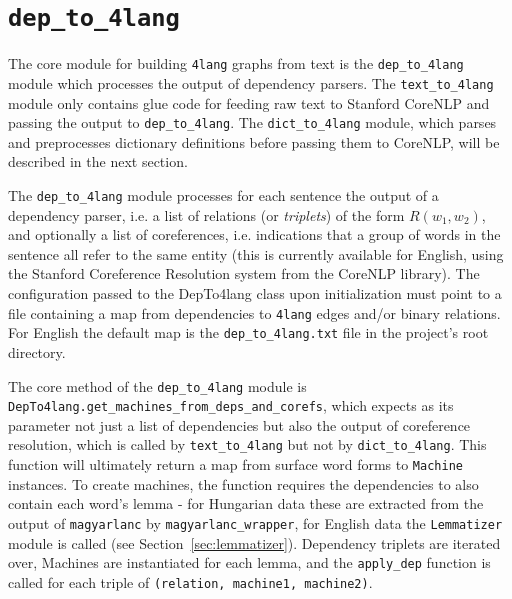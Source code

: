 \documentclass{article}
\newcommand{\defl}{\texttt{dep\_to\_4lang}\xspace}
\newcommand{\difl}{\texttt{dict\_to\_4lang}\xspace}
\newcommand{\tfl}{\texttt{text\_to\_4lang}\xspace}
\newcommand{\fl}{\texttt{4lang}\xspace}
\begin{document}
\section{\defl}
\label{sec:defl}
The core module for building \fl graphs from text is the \defl module which
processes the output of dependency parsers. The \tfl module
only contains glue code for feeding raw text to Stanford CoreNLP and passing the
output to \defl. The \difl module, which parses and preprocesses dictionary
definitions before passing them to CoreNLP, will be described in the next
section.

The \defl module processes for each sentence the output of a dependency parser,
i.e. a list of relations (or \textit{triplets}) of the form $R(w_1, w_2)$, and
optionally a list of coreferences, i.e. indications that a group of words
in the sentence all refer to the same entity (this is currently available for
English, using the Stanford Coreference Resolution system from the CoreNLP
library). The configuration passed to the DepTo4lang class upon initialization
must point to a file containing a map from dependencies to \fl edges and/or
binary relations. For English the default map is the \texttt{dep\_to\_4lang.txt}
file in the project's root directory.

The core method of the \defl module is \\
\texttt{DepTo4lang.get\_machines\_from\_deps\_and\_corefs}, which expects as
its parameter not just a list of dependencies but also the output of
coreference resolution, which is called by \tfl but not by \difl. This
function will ultimately return a map from surface word forms to
\texttt{Machine} instances. To create machines, the function requires the
dependencies to also contain each word's lemma - for Hungarian data these are
extracted from the output of \texttt{magyarlanc} by
\texttt{magyarlanc\_wrapper}, for English data the \texttt{Lemmatizer} module
is called (see Section~\ref{sec:lemmatizer}). Dependency triplets are iterated
over, Machines are instantiated for each lemma, and the \texttt{apply\_dep}
function is called for each triple of \texttt{(relation, machine1, machine2)}.
\end{document}
